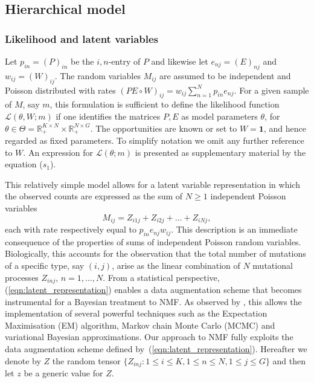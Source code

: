 \documentclass{bioinfo}
\begin{document}
\subsection{Hierarchical model}
\subsubsection{Likelihood and latent variables}
Let $p_{in} = (P)_{in}$ be the $i,n$-entry of $P$ and likewise let
$e_{nj} = (E)_{nj}$ and $w_{ij} = (W)_{ij}$.  The random variables
$M_{ij}$ are assumed to be independent and Poisson distributed with
rates 
$
  (PE\circ W)_{ij} = w_{ij}\sum_{n=1}^N p_{in}e_{nj}.
$
For a given sample of $M$, say $m$, this formulation is sufficient to
define the likelihood function $\mathcal L(\theta, W; m)$ if one
identifies the matrices $P, E$ as model parameters $\theta$, for
$\theta \in \Theta = \mathbb R_+^{K\times N}\times \mathbb
R_+^{N\times G}$. The opportunities are known or set to $W =
\mathbf{1}$, and hence regarded as fixed parameters. To simplify
notation we omit any further reference to $W$. An
expression for $\mathcal L(\theta; m)$ is presented as supplementary
material by the equation ($s_1$).


This relatively simple model allows for a latent variable
representation in which the observed counts are expressed as the sum
of $N\geq 1$ independent Poisson variables
\begin{equation}
  \label{eqn:latent_representation}
   M_{ij} = Z_{i1j} + Z_{i2j} + \ldots + Z_{iNj},
\end{equation} 
each with rate respectively equal to $p_{in}e_{nj}w_{ij}$. This
description is an immediate consequence of the properties of sums of
independent Poisson random variables. Biologically, this accounts for
the observation that the total number of mutations of a specific type,
say $(i,j)$, arise as the linear combination of $N$ mutational
processes $Z_{inj}$, $n = 1, \ldots, N$. From a statistical
perspective, (\ref{eqn:latent_representation}) enables a data
augmentation scheme that becomes instrumental for a Bayesian treatment
to NMF. As observed by \cite{C}, this allows the implementation of
several powerful techniques such as the Expectation Maximisation (EM)
algorithm, Markov chain Monte Carlo (MCMC) and variational Bayesian
approximations.  Our approach to NMF fully exploits the data
augmentation scheme defined by~(\ref{eqn:latent_representation}).
Hereafter we denote by $Z$ the random tensor $\{Z_{inj}: 1\leq i\leq
K, 1\leq n \leq N, 1\leq j\leq G\}$ and then let $z$ be a generic
value for $Z$.
\end{document}
